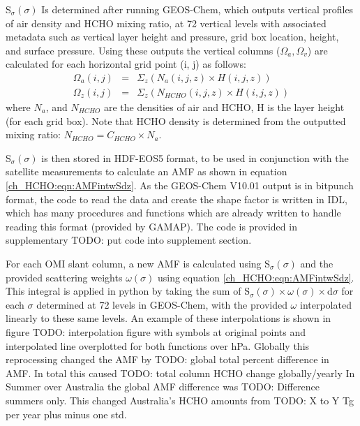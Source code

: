       
      S$_\sigma(\sigma)$ Is determined after running GEOS-Chem, which outputs vertical profiles of air density and HCHO mixing ratio, at 72 vertical levels with associated metadata such as vertical layer height and pressure, grid box location, height, and surface pressure.
      Using these outputs the vertical columns ($\Omega_a, \Omega_v$) are calculated for each horizontal grid point (i, j) as follows:
      \begin{align*}
      \Omega_a(i,j) &=& \Sigma_z \left( N_a(i,j,z) \times H(i,j,z) \right)
      \\
      \Omega_z(i,j) &=& \Sigma_z \left( N_{HCHO}(i,j,z) \times H(i,j,z) \right)
      \end{align*}
      where $N_a$, and $N_{HCHO}$ are the densities of air and HCHO, H is the layer height (for each grid box).
      Note that HCHO density is determined from the outputted mixing ratio: $N_{HCHO} = C_{HCHO} \times N_a$.
      
      S$_\sigma(\sigma)$ is then stored in HDF-EOS5 format, to be used in conjunction with the satellite measurements to calculate an AMF as shown in equation \ref{ch_HCHO:eqn:AMFintwSdz}.
      As the GEOS-Chem V10.01 output is in bitpunch format, the code to read the data and create the shape factor is written in IDL, which has many procedures and functions which are already written to handle reading this format (provided by GAMAP).
      The code is provided in supplementary TODO: put code into supplement section.
      
      For each OMI slant column, a new AMF is calculated using S$_\sigma(\sigma)$ and the provided scattering weights $\omega(\sigma)$ using equation \ref{ch_HCHO:eqn:AMFintwSdz}.
      This integral is applied in python by taking the sum of S$_\sigma(\sigma) \times \omega(\sigma) \times \mathrm{d}\sigma$ for each $\sigma$ determined at 72 levels in GEOS-Chem, with the provided $\omega$ interpolated linearly to these same levels.
      An example of these interpolations is shown in figure TODO: interpolation figure with symbols at original points and interpolated line overplotted for both functions over hPa.
      Globally this reprocessing changed the AMF by TODO: global total percent difference in AMF. 
      In total this caused TODO: total column HCHO change globally/yearly
      In Summer over Australia the global AMF difference was TODO: Difference summers only.
      This changed Australia's HCHO amounts from TODO: X to Y Tg per year plus minus one std.  
    
